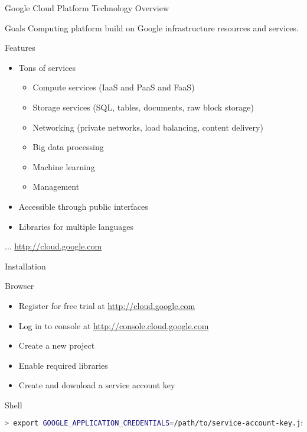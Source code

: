 \begin{frame}{Google Cloud Platform Technology Overview}
    \begin{block}{Goals}
        Computing platform build on Google infrastructure resources and services.
    \end{block}

    \bigskip

    \begin{block}{Features}
        \begin{itemize}
            \item Tons of services
            \begin{itemize}
                \item Compute services (IaaS and PaaS and FaaS)
                \item Storage services (SQL, tables, documents, raw block storage)
                \item Networking (private networks, load balancing, content delivery)
                \item Big data processing
                \item Machine learning
                \item Management
            \end{itemize}
            \item Accessible through public interfaces
            \item Libraries for multiple languages
        \end{itemize}
    \end{block}

    \bigskip

    \hfill ... \url{http://cloud.google.com}
\end{frame}


\begin{frame}[fragile]{Installation}
    \begin{block}{Browser}
        \begin{itemize}
            \item Register for free trial at \url{http://cloud.google.com}
            \item Log in to console at \url{http://console.cloud.google.com}
            \item Create a new project
            \item Enable required libraries
            \item Create and download a service account key
        \end{itemize}
    \end{block}
    \begin{block}{Shell}
\begin{lstlisting}[language=bash,style=mini]
> export GOOGLE_APPLICATION_CREDENTIALS=/path/to/service-account-key.json
\end{lstlisting}
    \end{block}
\end{frame}


